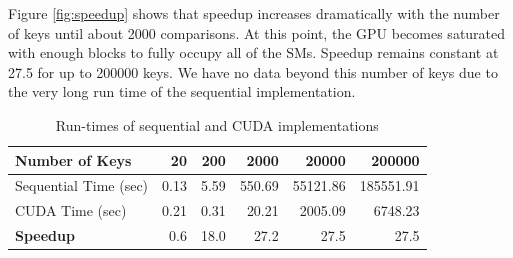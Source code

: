 \documentclass[10pt, conference]{./IEEEtran}
\begin{document}
Figure \ref{fig:speedup} shows that speedup increases dramatically with 
the number 
of keys until about 2000 comparisons. At this point, the GPU becomes saturated 
with enough blocks to fully occupy all of the SMs. Speedup remains constant at
27.5 for up to 200000 keys. We have no data beyond this number of keys due to 
the very long run time of the sequential implementation. 

%


\begin{table}
   \centering
   \begin{tabular}{|l|*{5}{r}|}\hline
      Number of Keys        & 20   & 200  & 2000   & 20000    & 200000 \\ \hline
      Sequential Time (sec) & 0.13 & 5.59 & 550.69 & 55121.86 & 185551.91\\
      CUDA Time (sec)       & 0.21 & 0.31 & 20.21  & 2005.09  & 6748.23\\\hline
      \textbf{Speedup}      & 0.6  & 18.0 & 27.2   & 27.5     & 27.5\\\hline
   \end{tabular}
   \caption{Run-times of sequential and CUDA implementations\label{tab:runtimes}}
\end{table}
\end{document}
